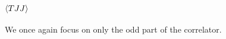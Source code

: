 \documentclass[a4paper,11pt]{article}
\begin{document}

\subsection{$\ev{TJJ}$}
We once again focus on only the odd part of the correlator. 
\end{document}
